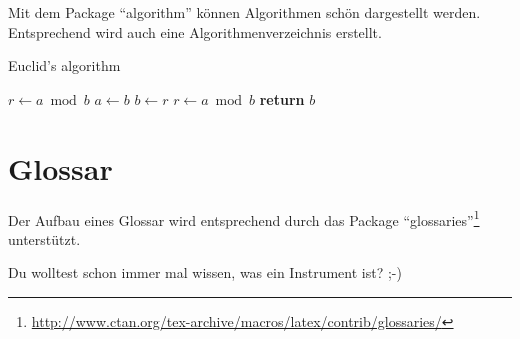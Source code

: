 Mit dem Package \enquote{algorithm} können Algorithmen schön dargestellt werden.
Entsprechend wird auch eine Algorithmenverzeichnis erstellt.

\begin{algorithm}
\caption{Euclid's algorithm}\label{euclid}
\begin{algorithmic}[1]
	\State $r\gets a\bmod b$
		\State $a\gets b$
		\State $b\gets r$
		\State $r\gets a\bmod b$
	\EndWhile\label{euclidendwhile}
	\State \textbf{return} $b$
\EndProcedure
\end{algorithmic}
\end{algorithm}

\section{Glossar}

Der Aufbau eines Glossar wird entsprechend durch das Package \enquote{glossaries}\footnote{\url{http://www.ctan.org/tex-archive/macros/latex/contrib/glossaries/}} unterstützt.

Du wolltest schon immer mal wissen, was ein \gls{Instrument} ist? ;-)
